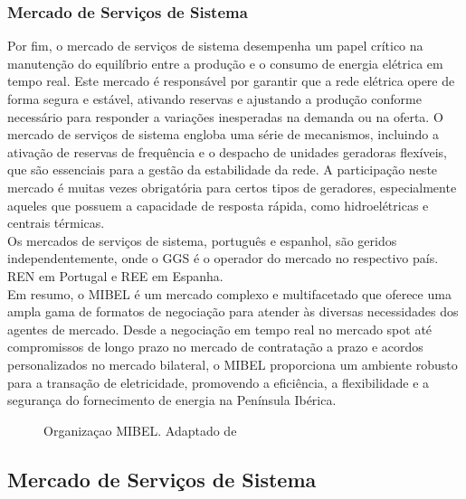 \subsubsection{Mercado de Serviços de Sistema \label{se:servicos_sistema_mibel}}
Por fim, o mercado de serviços de sistema desempenha um papel crítico na manutenção do equilíbrio entre a produção e o consumo de energia elétrica em tempo real. Este mercado é responsável por garantir que a rede elétrica opere de forma segura e estável, ativando reservas e ajustando a produção conforme necessário para responder a variações inesperadas na demanda ou na oferta. O mercado de serviços de sistema engloba uma série de mecanismos, incluindo a ativação de reservas de frequência e o despacho de unidades geradoras flexíveis, que são essenciais para a gestão da estabilidade da rede. A participação neste mercado é muitas vezes obrigatória para certos tipos de geradores, especialmente aqueles que possuem a capacidade de resposta rápida, como hidroelétricas e centrais térmicas.\\
Os mercados de serviços de sistema, português e espanhol, são geridos independentemente, onde o \gls{GGS} é o operador do mercado no respectivo país. \gls{REN} em Portugal e \gls{REE} em Espanha.\\
\bigskip
\bigskip
Em resumo, o \gls{MIBEL} é um mercado complexo e multifacetado que oferece uma ampla gama de formatos de negociação para atender às diversas necessidades dos agentes de mercado. Desde a negociação em tempo real no mercado spot até compromissos de longo prazo no mercado de contratação a prazo e acordos personalizados no mercado bilateral, o \gls{MIBEL} proporciona um ambiente robusto para a transação de eletricidade, promovendo a eficiência, a flexibilidade e a segurança do fornecimento de energia na Península Ibérica.\cite{Rassid2017}\\



\begin{figure}[H]
	\centering
	\resizebox{\linewidth}{!}{}
	\caption{Organizaçao MIBEL. Adaptado de \cite{Rassid2017}}
	\label{fig:mibel_org}
\end{figure}




\subsection{Mercado de Serviços de Sistema \label{se:servicos_sistema}}

